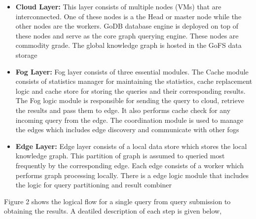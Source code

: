 \documentclass[conference]{IEEEtran}
\begin{document}
\begin{itemize}%
	\item \textbf{Cloud Layer:} This layer consists of multiple nodes (VMs) that are interconnected. One of these nodes is a the Head or master node while the other nodes are the workers. GoDB database engine is deployed on top of these nodes and serve as the core graph querying engine. These nodes are commodity grade. The global knowledge graph is hosted in the GoFS data storage
	\item \textbf{Fog Layer: } Fog layer consists of three essential modules. The Cache module consists of statistics manager for maintaining the statistics, cache replacement logic and cache store for storing the queries and their corresponding results. The Fog logic module is responsible for sending the query to cloud, retrieve the results and pass them to edge. It also performs cache check for any incoming query from the edge. The coordination module is used to manage the edges which includes edge discovery and communicate with other fogs
	\item \textbf{Edge Layer: }	Edge layer consists of a local data store which stores the local knowledge graph. This partition of graph is assumed to queried most frequently by the corresponding edge. Each edge consists of a worker which performs graph processing locally. There is a edge logic module that includes the logic for query partitioning and result combiner 
\end{itemize}

Figure 2 shows the logical flow for a single query from query submission to obtaining the results. A deatiled description of each step is given below,
\end{document}
